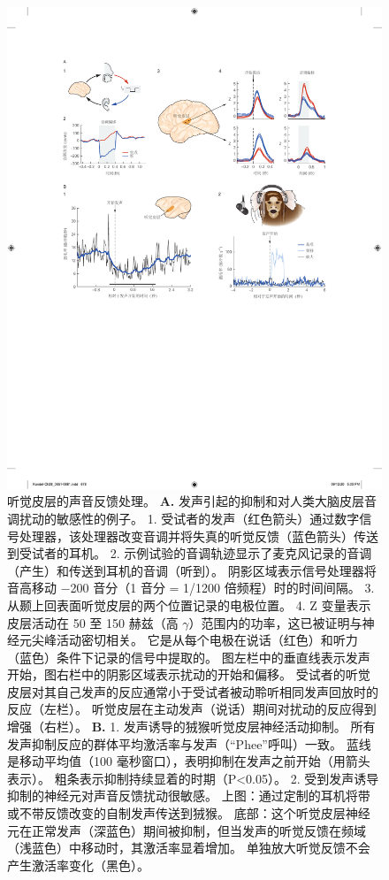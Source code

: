 \begin{figure}[htbp]
	\centering
	\includegraphics[width=1.0\linewidth]{chap28/fig_28_15}
	\caption{听觉皮层的声音反馈处理。
		\textbf{A.} 发声引起的抑制和对人类大脑皮层音调扰动的敏感性的例子。
	1. 受试者的发声（红色箭头）通过数字信号处理器，该处理器改变音调并将失真的听觉反馈（蓝色箭头）传送到受试者的耳机。 
	2. 示例试验的音调轨迹显示了麦克风记录的音调（产生）和传送到耳机的音调（听到）。
	阴影区域表示信号处理器将音高移动 −200 音分（1 音分 = 1/1200 倍频程）时的时间间隔。
	3. 从颞上回表面听觉皮层的两个位置记录的电极位置。
	4. Z 变量表示皮层活动在 50 至 150 赫兹（高 $\gamma$）范围内的功率，这已被证明与神经元尖峰活动密切相关。 
	它是从每个电极在说话（红色）和听力（蓝色）条件下记录的信号中提取的。
	图左栏中的垂直线表示发声开始，图右栏中的阴影区域表示扰动的开始和偏移。
	受试者的听觉皮层对其自己发声的反应通常小于受试者被动聆听相同发声回放时的反应（左栏）。 
	听觉皮层在主动发声（说话）期间对扰动的反应得到增强（右栏）\cite{houde2015cortical}。
	\textbf{B.} 1. 发声诱导的狨猴听觉皮层神经活动抑制。 
	所有发声抑制反应的群体平均激活率与发声（“Phee”呼叫）一致。 
	蓝线是移动平均值（100 毫秒窗口），表明抑制在发声之前开始（用箭头表示）。 
	粗条表示抑制持续显着的时期（P<0.05）\cite{eliades2003sensory}。
	2. 受到发声诱导抑制的神经元对声音反馈扰动很敏感。
	上图：通过定制的耳机将带或不带反馈改变的自制发声传送到狨猴。
	底部：这个听觉皮层神经元在正常发声（深蓝色）期间被抑制，但当发声的听觉反馈在频域（浅蓝色）中移动时，其激活率显着增加。
	单独放大听觉反馈不会产生激活率变化（黑色）\cite{eliades2008neural}。}
	\label{fig:28_15}
\end{figure}



